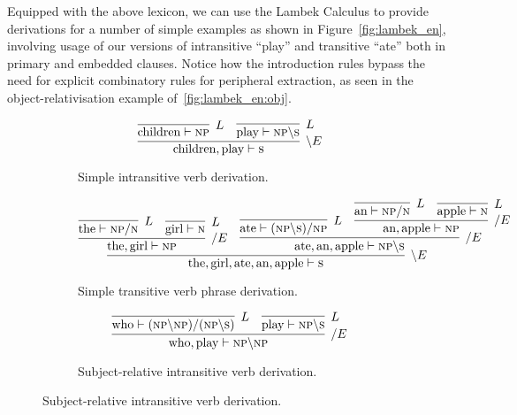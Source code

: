 Equipped with the above lexicon, we can use the Lambek Calculus to provide derivations for a number of simple examples as shown in Figure~\ref{fig:lambek_en}, involving usage of our versions of intransitive ``play'' and transitive ``ate'' both in primary and embedded clauses.
Notice how the introduction rules bypass the need for explicit combinatory rules for peripheral extraction, as seen in the object-relativisation example of~\ref{fig:lambek_en:obj}.

 \begin{figure}
     \begin{subfigure}[b]{1\textwidth}
         \centering
         \[
         \infer[\backslash E]{\text{children}, \text{play} \vdash \textsc{s}}{
             \infer[L]{\text{children} \vdash \textsc{np}}{}
             &
             \infer[L]{\text{play} \vdash \textsc{np}\backslash \textsc{s}}{}
         } 
         \]
         \caption{Simple intransitive verb derivation.}
     \end{subfigure}
     \begin{subfigure}[b]{1\textwidth}
         \centering
         \[
         \infer[\backslash E]{\text{the}, \text{girl}, \text{ate}, \text{an}, \text{apple} \vdash \textsc{s}}{
             \infer[/E]{\text{the}, \text{girl} \vdash \textsc{np}}{
                 \infer[L]{\text{the} \vdash \textsc{np} / \textsc{n}}{}
                 &
                 \infer[L]{\text{girl} \vdash \textsc{n}}{}
             }
             &
             \infer[/E]{\text{ate}, \text{an}, \text{apple} \vdash \textsc{np} \backslash \textsc{s}}{
                 \infer[L]{\text{ate} \vdash (\textsc{np} \backslash \textsc{s})/\textsc{np}}{}
                 &
                 \infer[/E]{\text{an}, \text{apple} \vdash \textsc{np}}{
                     \infer[L]{\text{an} \vdash \textsc{np}/ \textsc{n}}{}
                     &
                     \infer[L]{\text{apple} \vdash \textsc{n}}{}
                 }
             }
         }
         \]
         \caption{Simple transitive verb phrase derivation.}
     \end{subfigure}
     \begin{subfigure}[b]{1\textwidth}
     \[
     \infer[/ E]{\text{who}, \text{play} \vdash \textsc{np} \backslash \textsc{np}}{
     	\infer[L]{\text{who} \vdash (\textsc{np}\backslash \textsc{np}) / (\textsc{np} \backslash \textsc{s})}{}
     	&
     	\infer[L]{\text{play} \vdash \textsc{np} \backslash \textsc{s}}{}
     }
     \]
     \caption{Subject-relative intransitive verb derivation.}
     \end{subfigure}

\end{figure}
